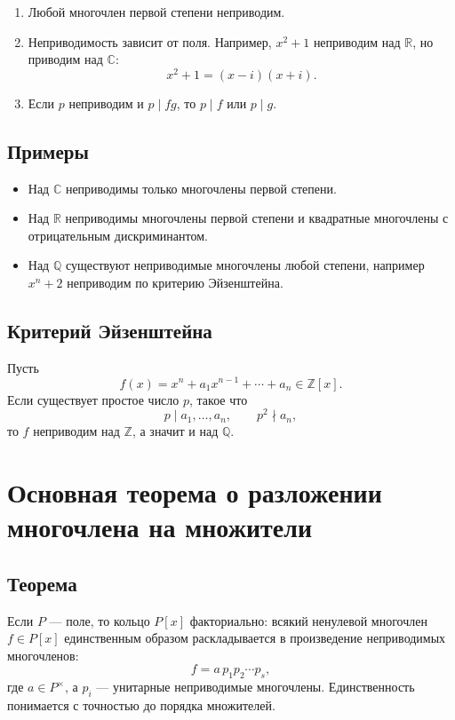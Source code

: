 \documentclass[12pt,a4paper]{article}
\newcommand{\R}{\mathbb{R}}
\renewcommand{\C}{\mathbb{C}}
\newcommand{\Q}{\mathbb{Q}}
\newcommand{\Z}{\mathbb{Z}}
\begin{document}
\begin{enumerate}
    \item Любой многочлен первой степени неприводим.
    \item Неприводимость зависит от поля. Например, $x^2+1$ неприводим над $\R$, но приводим над $\C$:
    \[
        x^2+1=(x-i)(x+i).
    \]
    \item Если $p$ неприводим и $p\mid fg$, то $p\mid f$ или $p\mid g$.
\end{enumerate}

\subsection*{Примеры}

\begin{itemize}
    \item Над $\C$ неприводимы только многочлены первой степени.
    \item Над $\R$ неприводимы многочлены первой степени и квадратные многочлены с отрицательным дискриминантом.
    \item Над $\Q$ существуют неприводимые многочлены любой степени, например $x^n+2$ неприводим по критерию Эйзенштейна.
\end{itemize}

\subsection*{Критерий Эйзенштейна}

Пусть
\[
    f(x)=x^n+a_1x^{n-1}+\cdots+a_n\in\Z[x].
\]
Если существует простое число $p$, такое что
\[
    p\mid a_1,\ldots,a_n,\qquad p^2\nmid a_n,
\]
то $f$ неприводим над $\Z$, а значит и над $\Q$.

\section{Основная теорема о разложении многочлена на множители}

\subsection*{Теорема}

Если $P$ --- поле, то кольцо $P[x]$ факториально: всякий ненулевой многочлен $f\in P[x]$ единственным образом раскладывается в произведение неприводимых многочленов:
\[
    f=a\,p_1p_2\cdots p_s,
\]
где $a\in P^\times$, а $p_i$ --- унитарные неприводимые многочлены. Единственность понимается с точностью до порядка множителей.
\end{document}

